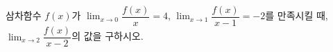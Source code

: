 삼차함수 $f(x)$가 $\displaystyle\lim_{x\to 0}\dfrac{f(x)}{x}=4$, $\displaystyle\lim_{x\to 1}\dfrac{f(x)}{x-1}=-2$를 만족시킬 때, $\displaystyle\lim_{x\to 2}\dfrac{f(x)}{x-2}$의 값을 구하시오.
